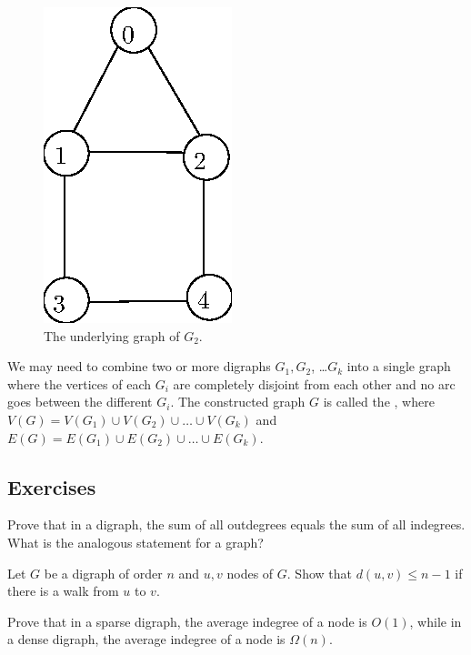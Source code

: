 \begin{figure}
\begin{center}
\includegraphics{figs/wUnderly.eps}
\end{center}
\caption{The underlying graph of $G_2$.}
\label{fig:underly}
\end{figure}

We may need to combine two or more digraphs $G_1, G_2$, \ldots $G_k$ into a
single graph where the vertices of each $G_i$ are completely disjoint from
each other and no arc goes between the different $G_i$. The constructed
graph $G$ is called the , where $V(G) = V(G_1) \cup
V(G_2) \cup \ldots \cup V(G_k)$ and $E(G) = E(G_1) \cup E(G_2) \cup \ldots
\cup E(G_k)$.

\subsection*{Exercises}

\begin{Exercise}
\label{ex:degree}
Prove that in a digraph, the sum of all outdegrees equals the sum of all 
indegrees. What is the analogous statement for a graph? 
\end{Exercise}

\begin{Exercise}
\label{ex:distbound}
Let $G$ be a digraph of order $n$ and $u, v$ nodes of $G$. 
Show that $d(u, v) \leq n - 1$ if there is a walk from $u$ to $v$.
\end{Exercise}


\begin{Exercise}
\label{ex:sparse-deg}
Prove that in a sparse digraph, the average indegree of a node is
$O(1)$, while in a dense digraph, the average indegree of a node is
$\Omega(n)$.
\end{Exercise}

